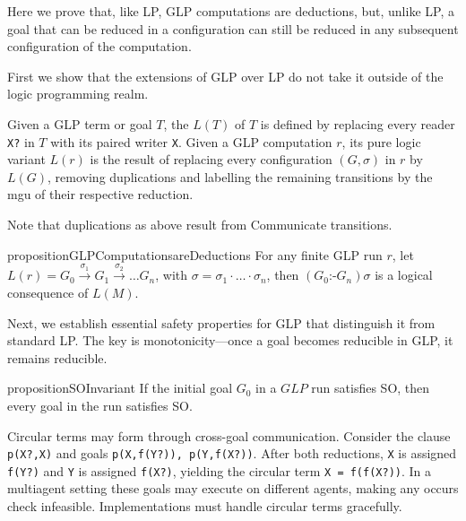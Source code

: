 Here we prove that, like LP, GLP computations are deductions, but, unlike LP, a goal that can be reduced in a configuration can still be reduced in any subsequent configuration of the computation.

  First we show that the extensions of GLP over LP do not take it outside of the logic programming realm.

\begin{definition}\label{definition:pure-logic}
Given a GLP term or goal $T$, the  $L(T)$ of $T$ is defined by replacing every reader \verb|X?| in $T$ with its paired writer \verb|X|. Given a GLP computation $r$, its pure logic variant $L(r)$ is the result of replacing every configuration $(G,\sigma)$ in $r$ by $L(G)$, removing duplications and labelling the remaining transitions by the mgu of their respective reduction.
\end{definition}
Note that duplications as above result from Communicate transitions.

\begin{restatable}{proposition}{GLPComputationsareDeductions}\label{theorem:GLP-computation-deduction}
For any finite GLP run $r$, let 
$L(r) = G_0\xrightarrow{\sigma_1}G_1\xrightarrow{\sigma_2}\ldots G_n$, 
with $\sigma = \sigma_1\cdot \ldots \cdot \sigma_n$, then $(G_0 \texttt{:-} G_n)\sigma$ is a logical consequence of $L(M)$.
\end{restatable}

Next, we establish essential safety properties for GLP that distinguish it from standard LP. The key is monotonicity—once a goal becomes reducible in GLP, it remains reducible.

\begin{restatable}[SO Invariant]{proposition}{SOInvariant}\label{proposition:so-preservation}
If the initial goal $G_0$ in a $GLP$ run satisfies SO, then every goal in the run satisfies SO.
\end{restatable}

Circular terms may form through cross-goal communication. Consider the clause \verb|p(X?,X)| and goals \verb|p(X,f(Y?)), p(Y,f(X?))|. After both reductions, \verb|X| is assigned \verb|f(Y?)| and \verb|Y| is assigned \verb|f(X?)|, yielding the circular term \verb|X = f(f(X?))|. In a multiagent setting these goals may execute on different agents, making any occurs check infeasible. Implementations must handle circular terms gracefully.

